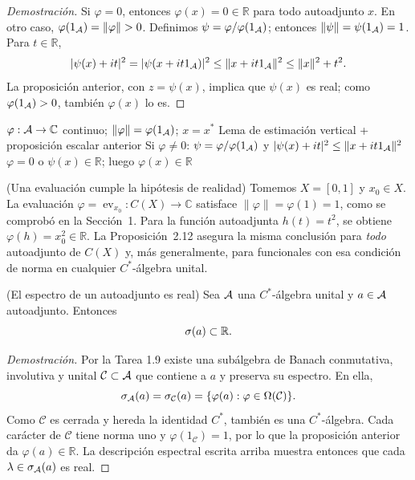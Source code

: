 \begin{proof}[Demostración]
Si $\varphi=0$, entonces $\varphi(x)=0\in\mathbb R$ para todo autoadjunto $x$.
En otro caso, $\varphi(1_\A)=\|\varphi\|>0$.
Definimos $\psi=\varphi/\varphi(1_\mathcal A)$; entonces $\|\psi\|=\psi(1_\mathcal A)=1$.
Para $t\in\mathbb R$,
\[
 |\psi(x)+it|^2
 =|\psi(x+it1_\mathcal A)|^2
 \le\|x+it1_\mathcal A\|^2
 \le\|x\|^2+t^2.
\]
La proposición anterior, con $z=\psi(x)$, implica que $\psi(x)$ es real; como
$\varphi(1_\mathcal A)>0$, también $\varphi(x)$ lo es.
\end{proof}

\proofdiagram
{$\varphi:\mathcal A\to\mathbb C$ continuo; $\|\varphi\|=\varphi(1_\mathcal A)$; $x=x^*$}
{Lema de estimación vertical + proposición escalar anterior}
{Si $\varphi\ne0$: $\psi=\varphi/\varphi(1_\mathcal A)$ y $|\psi(x)+it|^2\le\|x+it1_\mathcal A\|^2$}
{$\varphi=0$ o $\psi(x)\in\mathbb R$; luego $\varphi(x)\in\mathbb R$}

\begin{cthejemplo}{(Una evaluación cumple la hipótesis de realidad)}
Tomemos $X=[0,1]$ y $x_0\in X$. La evaluación
$\varphi=\operatorname{ev}_{x_0}:C(X)\to\mathbb C$ satisface
$\|\varphi\|=\varphi(1)=1$, como se comprobó en la Sección~1.
Para la función autoadjunta $h(t)=t^2$, se obtiene
$\varphi(h)=x_0^2\in\mathbb R$.
La Proposición~2.12 asegura la misma conclusión para \emph{todo} autoadjunto
de $C(X)$ y, más generalmente, para funcionales con esa condición de norma en
cualquier $C^*$-álgebra unital.
\end{cthejemplo}

\begin{cthproposicion}{(El espectro de un autoadjunto es real)}
Sea $\mathcal A$ una $C^*$-álgebra unital y $a\in\mathcal A$ autoadjunto. Entonces
\[
 \sigma(a)\subset\mathbb R.
\]
\end{cthproposicion}

\begin{proof}[Demostración]
Por la Tarea 1.9 existe una subálgebra de Banach conmutativa, involutiva y unital
$\mathcal C\subset\mathcal A$ que contiene a $a$ y preserva su espectro. En ella,
\[
 \sigma_\mathcal A(a)=\sigma_{\mathcal C}(a)=\{\varphi(a):\varphi\in\Omega(\mathcal C)\}.
\]
Como $\mathcal C$ es cerrada y hereda la identidad $C^*$, también es una
$C^*$-álgebra. Cada carácter de $\mathcal C$ tiene norma uno y
$\varphi(1_{\mathcal C})=1$, por lo que
la proposición anterior da
$\varphi(a)\in\mathbb R$. La descripción espectral escrita arriba muestra
entonces que cada $\lambda\in\sigma_\mathcal A(a)$ es real.
\end{proof}

